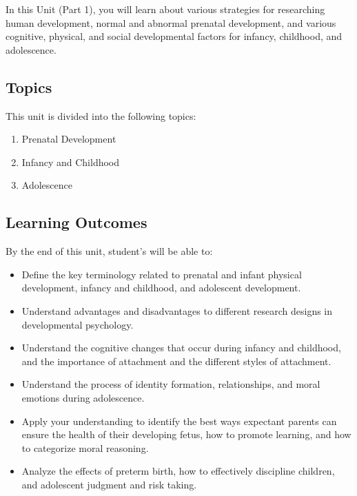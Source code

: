 \documentclass[
]{book}
\providecommand{\tightlist}{%
  \setlength{\itemsep}{0pt}\setlength{\parskip}{0pt}}
\begin{document}
In this Unit (Part 1), you will learn about various strategies for researching human development, normal and abnormal prenatal development, and various cognitive, physical, and social developmental factors for infancy, childhood, and adolescence.

\hypertarget{topics-2}{%
\subsection*{Topics}\label{topics-2}}

This unit is divided into the following topics:

\begin{enumerate}
\def\labelenumi{\arabic{enumi}.}
\tightlist
\item
  Prenatal Development\\
\item
  Infancy and Childhood\\
\item
  Adolescence
\end{enumerate}

\hypertarget{learning-outcomes-2}{%
\subsection*{Learning Outcomes}\label{learning-outcomes-2}}

By the end of this unit, student's will be able to:

\begin{itemize}
\tightlist
\item
  Define the key terminology related to prenatal and infant physical development, infancy and childhood, and adolescent development.\\
\item
  Understand advantages and disadvantages to different research designs in developmental psychology.\\
\item
  Understand the cognitive changes that occur during infancy and childhood, and the importance of attachment and the different styles of attachment.\\
\item
  Understand the process of identity formation, relationships, and moral emotions during adolescence.\\
\item
  Apply your understanding to identify the best ways expectant parents can ensure the health of their developing fetus, how to promote learning, and how to categorize moral reasoning.\\
\item
  Analyze the effects of preterm birth, how to effectively discipline children, and adolescent judgment and risk taking.
\end{itemize}
\end{document}
